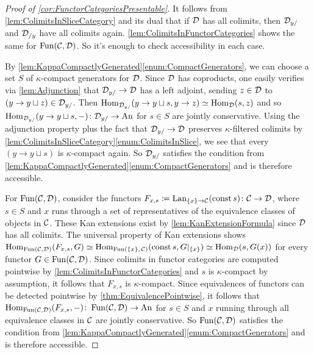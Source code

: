 \begin{proof}[Proof of \cref{cor:FunctorCategoriesPresentable}]
	It follows from \cref{lem:ColimitsInSliceCategory} and its dual that if $\mathcal{D}$ has all colimits, then $\mathcal{D}_{y/}$ and $\mathcal{D}_{/y}$ have all colimits again. \cref{lem:ColimitsInFunctorCategories} shows the same for $\operatorname{Fun}(\mathcal{C},\mathcal{D})$. So it's enough to check accessibility in each case.
	
	By \cref{lem:KappaCompactlyGenerated}\cref{enum:CompactGenerators}, we can choose a set $S$ of $\kappa$-compact generators for $\mathcal{D}$. Since $\mathcal{D}$ has coproducts, one easily verifies via \cref{lem:Adjunction} that $\mathcal{D}_{y/}\rightarrow\mathcal{D}$ has a left adjoint, sending $z\in\mathcal{D}$ to $(y\rightarrow y\sqcup z)\in\mathcal{D}_{y/}$. Then $\operatorname{Hom}_{\mathcal{D}_{y/}}(y\rightarrow y\sqcup s,y\rightarrow z)\simeq \operatorname{Hom}_{\mathcal{D}}(s,z)$ and so $\operatorname{Hom}_{\mathcal{D}_{y/}}(y\rightarrow y\sqcup s,-)\colon \mathcal{D}_{y/}\rightarrow\mathrm{An}$ for $s\in S$ are jointly conservative. Using the adjunction property plus the fact that $\mathcal{D}_{y/}\rightarrow \mathcal{D}$ preserves $\kappa$-filtered colimits by \cref{lem:ColimitsInSliceCategory}\cref{enum:ColimitsInSlice}, we see that every $(y\rightarrow y\sqcup s)$ is $\kappa$-compact again. So $\mathcal{D}_{y/}$ satisfies the condition from \cref{lem:KappaCompactlyGenerated}\cref{enum:CompactGenerators} and is therefore accessible.
	
	For $\operatorname{Fun}(\mathcal{C},\mathcal{D})$, consider the functors $F_{x,s}\coloneqq\operatorname{Lan}_{\{x\}\rightarrow \mathcal{C}}(\operatorname{const} s)\colon \mathcal{C}\rightarrow\mathcal{D}$, where $s\in S$ and $x$ runs through a set of representatives of the equivalence classes of objects in $\mathcal{C}$. These Kan extensions exist by \cref{lem:KanExtensionFormula} since $\mathcal{D}$ has all colimits. The universal property of Kan extensions shows $\operatorname{Hom}_{\operatorname{Fun}(\mathcal{C},\mathcal{D})}(F_{x,s},G)\simeq \operatorname{Hom}_{\operatorname{Fun}(\{x\},\,\mathcal{C})}(\operatorname{const} s,G|_{\{x\}})\simeq \operatorname{Hom}_{\mathcal{D}}(s,G(x))$ for every functor $G\in\operatorname{Fun}(\mathcal{C},\mathcal{D})$. Since colimits in functor categories are computed pointwise by \cref{lem:ColimitsInFunctorCategories} and $s$ is $\kappa$-compact by assumption, it follows that $F_{x,s}$ is $\kappa$-compact. Since equivalences of functors can be detected pointwise by \cref{thm:EquivalencePointwise}, it follows that $\operatorname{Hom}_{\operatorname{Fun}(\mathcal{C},\mathcal{D})}(F_{x,s},-)\colon \operatorname{Fun}(\mathcal{C},\mathcal{D})\rightarrow\mathrm{An}$ for $s\in S$ and $x$ running through all equivalence classes in $\mathcal{C}$ are jointly conservative. So $\operatorname{Fun}(\mathcal{C},\mathcal{D})$ satisfies the condition from \cref{lem:KappaCompactlyGenerated}\cref{enum:CompactGenerators} and is therefore accessible.
	

\end{proof}
